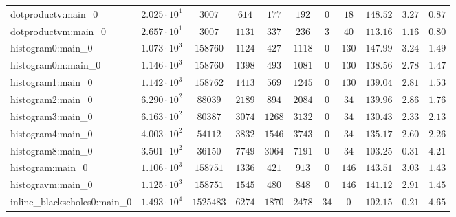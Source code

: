 \begin{tabular}{|l|c|c|c|c|c|c|c|c|c|c|}
dotproductv:main\_0            & $ 2.025 \cdot 10^{1} $ & $ 3007     $ & $ 614    $ & $ 177    $ & $ 192    $ & $ 0    $ & $ 18   $ & $ 148.52      $ & $ 3.27    $ & $ 0.87    $ \\
dotproductvm:main\_0           & $ 2.657 \cdot 10^{1} $ & $ 3007     $ & $ 1131   $ & $ 337    $ & $ 236    $ & $ 3    $ & $ 40   $ & $ 113.16      $ & $ 1.16    $ & $ 0.80    $ \\
histogram0:main\_0             & $ 1.073 \cdot 10^{3} $ & $ 158760   $ & $ 1124   $ & $ 427    $ & $ 1118   $ & $ 0    $ & $ 130  $ & $ 147.99      $ & $ 3.24    $ & $ 1.49    $ \\
histogram0m:main\_0            & $ 1.146 \cdot 10^{3} $ & $ 158760   $ & $ 1398   $ & $ 493    $ & $ 1081   $ & $ 0    $ & $ 130  $ & $ 138.56      $ & $ 2.78    $ & $ 1.47    $ \\
histogram1:main\_0             & $ 1.142 \cdot 10^{3} $ & $ 158762   $ & $ 1413   $ & $ 569    $ & $ 1245   $ & $ 0    $ & $ 130  $ & $ 139.04      $ & $ 2.81    $ & $ 1.53    $ \\
histogram2:main\_0             & $ 6.290 \cdot 10^{2} $ & $ 88039    $ & $ 2189   $ & $ 894    $ & $ 2084   $ & $ 0    $ & $ 34   $ & $ 139.96      $ & $ 2.86    $ & $ 1.76    $ \\
histogram3:main\_0             & $ 6.163 \cdot 10^{2} $ & $ 80387    $ & $ 3074   $ & $ 1268   $ & $ 3132   $ & $ 0    $ & $ 34   $ & $ 130.43      $ & $ 2.33    $ & $ 2.13    $ \\
histogram4:main\_0             & $ 4.003 \cdot 10^{2} $ & $ 54112    $ & $ 3832   $ & $ 1546   $ & $ 3743   $ & $ 0    $ & $ 34   $ & $ 135.17      $ & $ 2.60    $ & $ 2.26    $ \\
histogram8:main\_0             & $ 3.501 \cdot 10^{2} $ & $ 36150    $ & $ 7749   $ & $ 3064   $ & $ 7191   $ & $ 0    $ & $ 34   $ & $ 103.25      $ & $ 0.31    $ & $ 4.21    $ \\
histogram:main\_0              & $ 1.106 \cdot 10^{3} $ & $ 158751   $ & $ 1336   $ & $ 421    $ & $ 913    $ & $ 0    $ & $ 146  $ & $ 143.51      $ & $ 3.03    $ & $ 1.43    $ \\
histogravm:main\_0             & $ 1.125 \cdot 10^{3} $ & $ 158751   $ & $ 1545   $ & $ 480    $ & $ 848    $ & $ 0    $ & $ 146  $ & $ 141.12      $ & $ 2.91    $ & $ 1.45    $ \\
inline\_blackscholes0:main\_0  & $ 1.493 \cdot 10^{4} $ & $ 1525483  $ & $ 6274   $ & $ 1870   $ & $ 2478   $ & $ 34   $ & $ 0    $ & $ 102.15      $ & $ 0.21    $ & $ 4.65    $ \\

\end{tabular}
